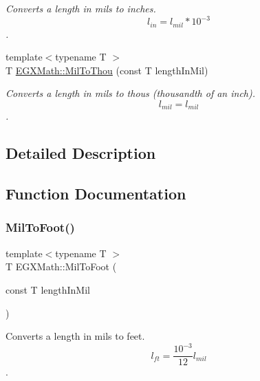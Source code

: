 \begin{DoxyCompactItemize}
\begin{DoxyCompactList}\small\item\em Converts a length in mils to inches. \[ l_{in}= l_{mil} * 10^{-3} \]. \end{DoxyCompactList}\item 
{\footnotesize template$<$typename T $>$ }\\T \mbox{\hyperlink{group___e_g_x_math-_conversions-_length_conversions-_imperial-_mil-_imperial_gad56400e34744827dbf9b886f6261c0de}{E\+G\+X\+Math\+::\+Mil\+To\+Thou}} (const T length\+In\+Mil)
\begin{DoxyCompactList}\small\item\em Converts a length in mils to thous (thousandth of an inch). \[ l_{mil}= l_{mil} \]. \end{DoxyCompactList}\end{DoxyCompactItemize}


\subsection{Detailed Description}


\subsection{Function Documentation}
\mbox{\label{group___e_g_x_math-_conversions-_length_conversions-_imperial-_mil-_imperial_ga713e0647ca6e88ca4700e36c896fd276}} 
\subsubsection{\texorpdfstring{Mil\+To\+Foot()}{MilToFoot()}}
{\footnotesize\ttfamily template$<$typename T $>$ \\
T E\+G\+X\+Math\+::\+Mil\+To\+Foot (\begin{DoxyParamCaption}\item[{const T}]{length\+In\+Mil }\end{DoxyParamCaption})}



Converts a length in mils to feet. \[ l_{ft}= \frac{10^{-3}}{12} l_{mil} \]. 

